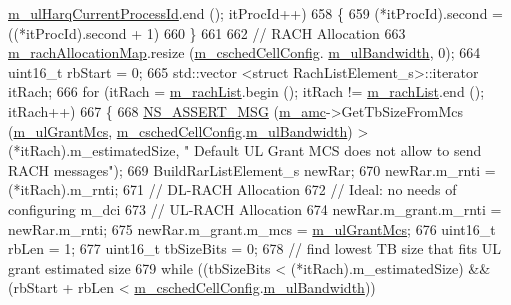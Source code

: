 \begin{DoxyCode}
      \hyperlink{classns3_1_1TtaFfMacScheduler_af8bd1675d63b73c0374a39180e1cbf54}{m\_ulHarqCurrentProcessId}.end (); itProcId++)
658     \{
659       (*itProcId).second = ((*itProcId).second + 1) %
660     \}
661 
662   \textcolor{comment}{// RACH Allocation}
663   \hyperlink{classns3_1_1TtaFfMacScheduler_a5cef51239a7f724ce375f0ddf883e73c}{m\_rachAllocationMap}.resize (\hyperlink{classns3_1_1TtaFfMacScheduler_af263a06ea69ff1d096ddb48df0ac7f81}{m\_cschedCellConfig}.
      \hyperlink{structns3_1_1FfMacCschedSapProvider_1_1CschedCellConfigReqParameters_a5ab5b102878e6e7e7727a14af4a64d2f}{m\_ulBandwidth}, 0);
664   uint16\_t rbStart = 0;
665   std::vector <struct RachListElement\_s>::iterator itRach;
666   \textcolor{keywordflow}{for} (itRach = \hyperlink{classns3_1_1TtaFfMacScheduler_ac2f848953754daa546155b20aa1d9ace}{m\_rachList}.begin (); itRach != \hyperlink{classns3_1_1TtaFfMacScheduler_ac2f848953754daa546155b20aa1d9ace}{m\_rachList}.end (); itRach++)
667     \{
668       \hyperlink{assert_8h_aff5ece9066c74e681e74999856f08539}{NS\_ASSERT\_MSG} (\hyperlink{classns3_1_1TtaFfMacScheduler_a9c8e60d48cae88a03fb5621285733186}{m\_amc}->GetTbSizeFromMcs (\hyperlink{classns3_1_1TtaFfMacScheduler_af999ba34a23583421c6a34df08608e47}{m\_ulGrantMcs}, 
      \hyperlink{classns3_1_1TtaFfMacScheduler_af263a06ea69ff1d096ddb48df0ac7f81}{m\_cschedCellConfig}.\hyperlink{structns3_1_1FfMacCschedSapProvider_1_1CschedCellConfigReqParameters_a5ab5b102878e6e7e7727a14af4a64d2f}{m\_ulBandwidth}) > (*itRach).m\_estimatedSize, \textcolor{stringliteral}{" Default UL
       Grant MCS does not allow to send RACH messages"});
669       BuildRarListElement\_s newRar;
670       newRar.m\_rnti = (*itRach).m\_rnti;
671       \textcolor{comment}{// DL-RACH Allocation}
672       \textcolor{comment}{// Ideal: no needs of configuring m\_dci}
673       \textcolor{comment}{// UL-RACH Allocation}
674       newRar.m\_grant.m\_rnti = newRar.m\_rnti;
675       newRar.m\_grant.m\_mcs = \hyperlink{classns3_1_1TtaFfMacScheduler_af999ba34a23583421c6a34df08608e47}{m\_ulGrantMcs};
676       uint16\_t rbLen = 1;
677       uint16\_t tbSizeBits = 0;
678       \textcolor{comment}{// find lowest TB size that fits UL grant estimated size}
679       \textcolor{keywordflow}{while} ((tbSizeBits < (*itRach).m\_estimatedSize) && (rbStart + rbLen < 
      \hyperlink{classns3_1_1TtaFfMacScheduler_af263a06ea69ff1d096ddb48df0ac7f81}{m\_cschedCellConfig}.\hyperlink{structns3_1_1FfMacCschedSapProvider_1_1CschedCellConfigReqParameters_a5ab5b102878e6e7e7727a14af4a64d2f}{m\_ulBandwidth}))

\end{DoxyCode}
